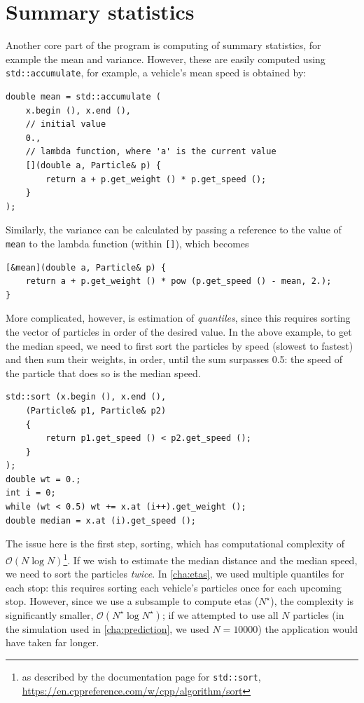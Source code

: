 \section{Summary statistics}
\label{app:particle-summaries}

Another core part of the program is computing of summary statistics, for example the mean and variance. However, these are easily computed using {\tt std::accumulate}, for example, a vehicle's mean speed is obtained by:
\begin{lstlisting}
double mean = std::accumulate (
    x.begin (), x.end (),
    // initial value
    0.,
    // lambda function, where 'a' is the current value
    [](double a, Particle& p) {
        return a + p.get_weight () * p.get_speed ();
    }
);
\end{lstlisting}
Similarly, the variance can be calculated by passing a reference to the value of {\tt mean} to the lambda function (within {\tt []}), which becomes
\begin{lstlisting}
[&mean](double a, Particle& p) {
    return a + p.get_weight () * pow (p.get_speed () - mean, 2.);
}
\end{lstlisting}

More complicated, however, is estimation of \emph{quantiles}, since this requires sorting the vector of particles in order of the desired value. In the above example, to get the median speed, we need to first sort the particles by speed (slowest to fastest) and then sum their weights, in order, until the sum surpasses 0.5: the speed of the particle that does so is the median speed.
\begin{lstlisting}
std::sort (x.begin (), x.end (),
    (Particle& p1, Particle& p2)
    {
        return p1.get_speed () < p2.get_speed ();
    }
);
double wt = 0.;
int i = 0;
while (wt < 0.5) wt += x.at (i++).get_weight ();
double median = x.at (i).get_speed ();
\end{lstlisting}

The issue here is the first step, sorting, which has computational complexity of $\mathcal{O}(N\log N)$\footnote{as described by the documentation page for {\tt std::sort}, \url{https://en.cppreference.com/w/cpp/algorithm/sort}}. If we wish to estimate the median distance and the median speed, we need to sort the particles \emph{twice}. In \cref{cha:etas}, we used multiple quantiles for each stop: this requires sorting each vehicle's particles once for each upcoming stop. However, since we use a subsample to compute \glspl{eta} ($N^\star$), the complexity is significantly smaller, $\mathcal{O}(N^\star\log N^\star)$; if we attempted to use all $N$ particles (in the simulation used in \cref{cha:prediction}, we used $N=10000$) the application would have taken far longer.




